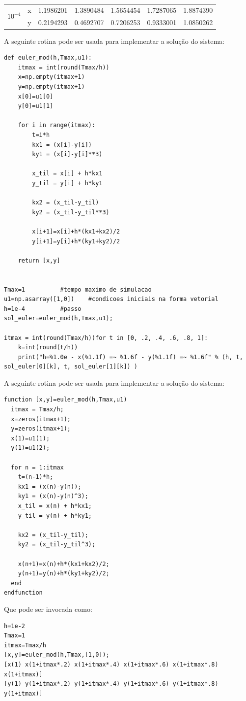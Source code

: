 \begin{resol}
\begin{center}
\begin{tabular}{|l|l|l|l|l|l|l|}
   \multirow{2}{*}{$10^{-4}$} &x  &1.1986201 &1.3890484 &1.5654454 &1.7287065 &1.8874390\\
			       &y&  0.2194293 &0.4692707 &0.7206253 &0.9333001 &1.0850262 \\
   \hline
   \end{tabular}
\end{center}
\ifispython
A seguinte rotina pode ser usada para implementar a solução do sistema:
\begin{verbatim}
def euler_mod(h,Tmax,u1):
  	itmax = int(round(Tmax/h))
	x=np.empty(itmax+1)
	y=np.empty(itmax+1)
	x[0]=u1[0]
	y[0]=u1[1]

	for i in range(itmax):
		t=i*h
		kx1 = (x[i]-y[i])
		ky1 = (x[i]-y[i]**3)

		x_til = x[i] + h*kx1
		y_til = y[i] + h*ky1

		kx2 = (x_til-y_til)
		ky2 = (x_til-y_til**3)

		x[i+1]=x[i]+h*(kx1+kx2)/2
		y[i+1]=y[i]+h*(ky1+ky2)/2

	return [x,y]


Tmax=1 			#tempo maximo de simulacao
u1=np.asarray([1,0])	#condicoes iniciais na forma vetorial
h=1e-4			#passo
sol_euler=euler_mod(h,Tmax,u1);

itmax = int(round(Tmax/h))for t in [0, .2, .4, .6, .8, 1]:
	k=int(round(t/h))
	print("h=%1.0e - x(%1.1f) =~ %1.6f - y(%1.1f) =~ %1.6f" % (h, t, sol_euler[0][k], t, sol_euler[1][k]) )

\end{verbatim}
\fi

\ifisoctave
A seguinte rotina pode ser usada para implementar a solução do sistema:
\begin{verbatim}
function [x,y]=euler_mod(h,Tmax,u1)
  itmax = Tmax/h;
  x=zeros(itmax+1);
  y=zeros(itmax+1);
  x(1)=u1(1);
  y(1)=u1(2);

  for n = 1:itmax
    t=(n-1)*h;
    kx1 = (x(n)-y(n));
    ky1 = (x(n)-y(n)^3);
    x_til = x(n) + h*kx1;
    y_til = y(n) + h*ky1;

    kx2 = (x_til-y_til);
    ky2 = (x_til-y_til^3);

    x(n+1)=x(n)+h*(kx1+kx2)/2;
    y(n+1)=y(n)+h*(ky1+ky2)/2;
  end
endfunction
\end{verbatim}
Que pode ser invocada como:
\begin{verbatim}
h=1e-2
Tmax=1
itmax=Tmax/h
[x,y]=euler_mod(h,Tmax,[1,0]);
[x(1) x(1+itmax*.2) x(1+itmax*.4) x(1+itmax*.6) x(1+itmax*.8) x(1+itmax)]
[y(1) y(1+itmax*.2) y(1+itmax*.4) y(1+itmax*.6) y(1+itmax*.8) y(1+itmax)]
 \end{verbatim}


\end{resol}
